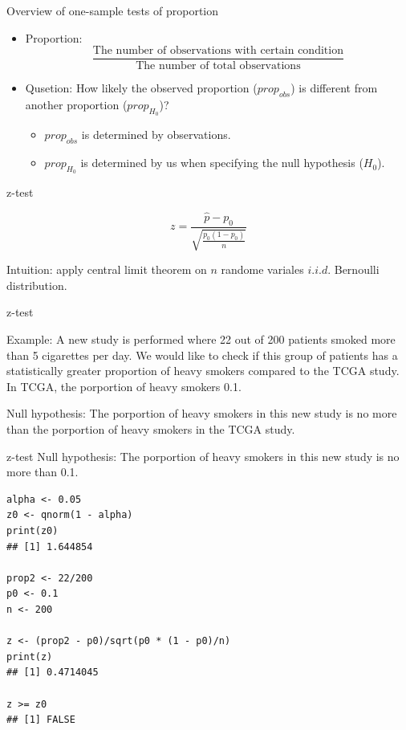 \documentclass[12pt, t, xcolor=dvipsnames]{beamer}
\begin{document}
\begin{frame}{Overview of one-sample tests of proportion}
\begin{itemize}
  \item Proportion: $$\frac{\text{The number of observations with certain condition}}{\text{The number of total observations}}$$
  \item Qusetion: How likely the observed proportion ($prop_{obs}$) is different from another proportion ($prop_{H_0}$)?
  \begin{itemize}
    \item $prop_{obs}$ is determined by observations.
    \item $prop_{H_0}$ is determined by us when specifying the null hypothesis ($H_0$).
  \end{itemize}
  
\end{itemize}
\end{frame}

\begin{frame}[fragile]{z-test}

$$z = \frac{\hat{p} -p_0}{\sqrt{\frac{p_0 (1- p_0)}{n}}}$$

Intuition: apply central limit theorem on $n$ randome variales $i.i.d.$ Bernoulli distribution.
\end{frame}

\begin{frame}[fragile]{z-test}

Example: A new study is performed where 22 out of 200 patients smoked more than 5 cigarettes per day. We would like to check if this group of patients has a statistically greater proportion of heavy smokers compared to the TCGA study. In TCGA, the porportion of heavy smokers 0.1. 

Null hypothesis: The porportion of heavy smokers in this new study is no more than the porportion of heavy smokers in the TCGA study. 

\end{frame}

\begin{frame}[fragile]{z-test}
Null hypothesis: The porportion of heavy smokers in this new study is no more than 0.1. 

\begin{verbatim}
alpha <- 0.05
z0 <- qnorm(1 - alpha)
print(z0)
## [1] 1.644854

prop2 <- 22/200
p0 <- 0.1
n <- 200

z <- (prop2 - p0)/sqrt(p0 * (1 - p0)/n)
print(z)
## [1] 0.4714045

z >= z0
## [1] FALSE
\end{verbatim}
\end{frame}
\end{document}
